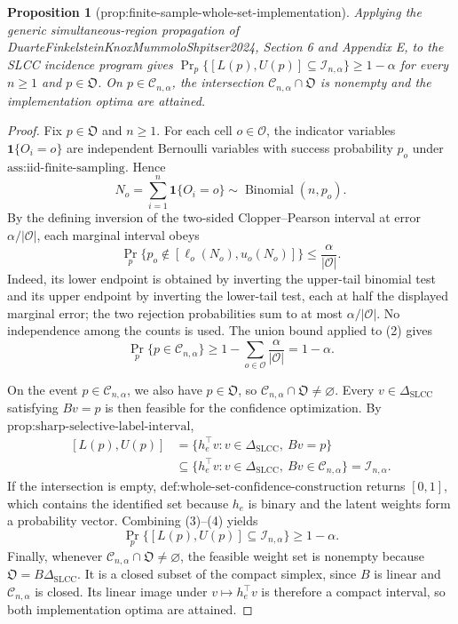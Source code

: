 \documentclass{article}
\newtheorem{proposition}{Proposition}
\begin{document}
\begin{proposition}[prop:finite-sample-whole-set-implementation]\label{prop:finite-sample-whole-set-implementation}
Applying the generic simultaneous-region propagation of DuarteFinkelsteinKnoxMummoloShpitser2024, Section 6 and Appendix E, to the SLCC incidence program gives \(\Pr_p\{[L(p),U(p)]\subseteq\mathcal I_{n,\alpha}\}\ge1-\alpha\) for every \(n\ge1\) and \(p\in\mathfrak O\). On \(p\in\mathcal C_{n,\alpha}\), the intersection \(\mathcal C_{n,\alpha}\cap\mathfrak O\) is nonempty and the implementation optima are attained.
\end{proposition}
\begin{proof}
Fix \(p\in\mathfrak O\) and \(n\geq1\).  For each cell \(o\in\mathcal O\), the indicator variables \(\mathbf 1\{O_i=o\}\) are independent Bernoulli variables with success probability \(p_o\) under \(\text{ass:iid-finite-sampling}\).  Hence
\[
N_o=\sum_{i=1}^n\mathbf 1\{O_i=o\}\sim\operatorname{Binomial}(n,p_o).
\tag{1}
\]
By the defining inversion of the two-sided Clopper--Pearson interval at error \(\alpha/|\mathcal O|\), each marginal interval obeys
\[
\Pr_p\{p_o\notin[\ell_o(N_o),u_o(N_o)]\}
\leq\frac{\alpha}{|\mathcal O|}.
\tag{2}
\]
Indeed, its lower endpoint is obtained by inverting the upper-tail binomial test and its upper endpoint by inverting the lower-tail test, each at half the displayed marginal error; the two rejection probabilities sum to at most \(\alpha/|\mathcal O|\).  No independence among the counts is used.  The union bound applied to (2) gives
\[
\Pr_p\{p\in\mathcal C_{n,\alpha}\}
\geq1-\sum_{o\in\mathcal O}\frac{\alpha}{|\mathcal O|}
=1-\alpha.
\tag{3}
\]

On the event \(p\in\mathcal C_{n,\alpha}\), we also have \(p\in\mathfrak O\), so \(\mathcal C_{n,\alpha}\cap\mathfrak O\neq\varnothing\).  Every \(v\in\Delta_{\mathrm{SLCC}}\) satisfying \(Bv=p\) is then feasible for the confidence optimization.  By \(\text{prop:sharp-selective-label-interval}\),
\[
\begin{aligned}
[L(p),U(p)]
&=\{h_e^{\top}v:v\in\Delta_{\mathrm{SLCC}},\ Bv=p\}\\
&\subseteq
\{h_e^{\top}v:v\in\Delta_{\mathrm{SLCC}},\ Bv\in\mathcal C_{n,\alpha}\}
=\mathcal I_{n,\alpha}.
\end{aligned}
\tag{4}
\]
If the intersection is empty, \(\text{def:whole-set-confidence-construction}\) returns \([0,1]\), which contains the identified set because \(h_e\) is binary and the latent weights form a probability vector.  Combining (3)--(4) yields
\[
\Pr_p\{[L(p),U(p)]\subseteq\mathcal I_{n,\alpha}\}\geq1-\alpha.
\]
Finally, whenever \(\mathcal C_{n,\alpha}\cap\mathfrak O\neq\varnothing\), the feasible weight set is nonempty because \(\mathfrak O=B\Delta_{\mathrm{SLCC}}\).  It is a closed subset of the compact simplex, since \(B\) is linear and \(\mathcal C_{n,\alpha}\) is closed.  Its linear image under \(v\mapsto h_e^{\top}v\) is therefore a compact interval, so both implementation optima are attained.
\end{proof}
\end{document}
